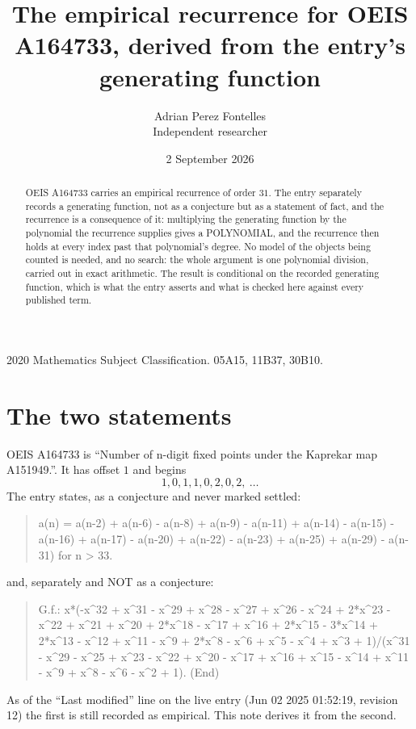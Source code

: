 \documentclass[11pt,a4paper]{article}
\title{The empirical recurrence for OEIS A164733, derived from the entry's generating function}
\author{Adrian Perez Fontelles\\ \small Independent researcher}
\date{2 September 2026}
\theoremstyle{plain}
\theoremstyle{definition}
\begin{document}
\maketitle

\begin{abstract}
OEIS A164733 carries an empirical recurrence of order $31$. The entry separately records a
generating function, not as a conjecture but as a statement of fact, and the recurrence is a
consequence of it: multiplying the generating function by the polynomial the recurrence
supplies gives a POLYNOMIAL, and the recurrence then holds at every index past that
polynomial's degree. No model of the objects being counted is needed, and no search: the
whole argument is one polynomial division, carried out in exact arithmetic. The result is
conditional on the recorded generating function, which is what the entry asserts and what is
checked here against every published term.
\end{abstract}

\noindent\small 2020 Mathematics Subject Classification. 05A15, 11B37, 30B10.\normalsize

\section{The two statements}

OEIS A164733 is ``Number of n-digit fixed points under the Kaprekar map A151949.''. It has offset $1$ and begins
\[
1, 0, 1, 1, 0, 2, 0, 2,\ \dots
\]
The entry states, as a conjecture and never marked settled:
\begin{quote}
a(n) = a(n-2) + a(n-6) - a(n-8) + a(n-9) - a(n-11) + a(n-14) - a(n-15) - a(n-16) + a(n-17) - a(n-20) + a(n-22) - a(n-23) + a(n-25) + a(n-29) - a(n-31) for n > 33.
\end{quote}
and, separately and NOT as a conjecture:
\begin{quote}
G.f.: x*(-x\^{}32 + x\^{}31 - x\^{}29 + x\^{}28 - x\^{}27 + x\^{}26 - x\^{}24 + 2*x\^{}23 - x\^{}22 + x\^{}21 + x\^{}20 + 2*x\^{}18 - x\^{}17 + x\^{}16 + 2*x\^{}15 - 3*x\^{}14 + 2*x\^{}13 - x\^{}12 + x\^{}11 - x\^{}9 + 2*x\^{}8 - x\^{}6 + x\^{}5 - x\^{}4 + x\^{}3 + 1)/(x\^{}31 - x\^{}29 - x\^{}25 + x\^{}23 - x\^{}22 + x\^{}20 - x\^{}17 + x\^{}16 + x\^{}15 - x\^{}14 + x\^{}11 - x\^{}9 + x\^{}8 - x\^{}6 - x\^{}2 + 1). (End)
\end{quote}
As of the ``Last modified'' line on the live entry (Jun 02 2025 01:52:19, revision 12) the first is still
recorded as empirical. This note derives it from the second.
\end{document}
